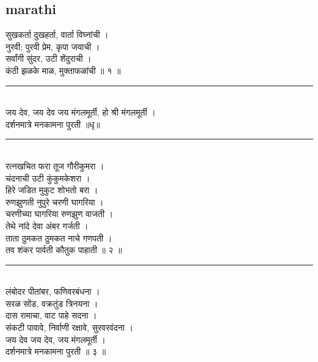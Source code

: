 \documentclass[letterpaper,twocolumn,openany,nodeprecatedcode]{dndbook}
\begin{document}
\subsection*{marathi}
\begin{flushleft}
  सुखकर्ता दुखहर्ता, वार्ता विघ्नांची । \\
  नुरवी; पुरवी प्रेम, कृपा जयाची ।\\
  सर्वांगी सुंदर, उटी शेंदुराची । \\
  कंठी झळके माळ, मुक्ताफळांची ॥ १ ॥ \\
  \rule{\linewidth}{1pt} \\
  जय देव, जय देव जय मंगलमूर्ती, हो श्री मंगलमूर्ती । \\
  दर्शनमात्रे मनकामना पुरती ॥धृ॥ \\
  \rule{\linewidth}{1pt} \\
  रत्नखचित फरा तूज गौरीकुमरा । \\
  चंदनाची उटी कुंकुमकेशरा । \\
  हिरे जडित मुकुट शोभतो बरा । \\
  रुणझुणती नुपुरे चरणी घागरिया । \\
  चरणीच्या घागरिया रुणझुण वाजती । \\
  तेथे नांदे देवा अंबर गर्जती । \\
  ताता ठुमकत ठुमकत नाचे गणपती । \\
  तव शंकर पार्वती कौतुक पाहाती ॥ २ ॥ \\
  \rule{\linewidth}{1pt} \\
  लंबोदर पीतांबर, फणिवरबंधना । \\
  सरळ सोंड, वक्रतुंड त्रिनयना । \\
  दास रामाचा, वाट पाहे सदना । \\
  संकटी पावावे, निर्वाणी रक्षावे, सुरवरवंदना । \\
  जय देव जय देव, जय मंगलमूर्ती । \\
  दर्शनमात्रे मनकामना पुरती ॥ ३ ॥
  \pagebreak

\end{flushleft}
\end{document}
